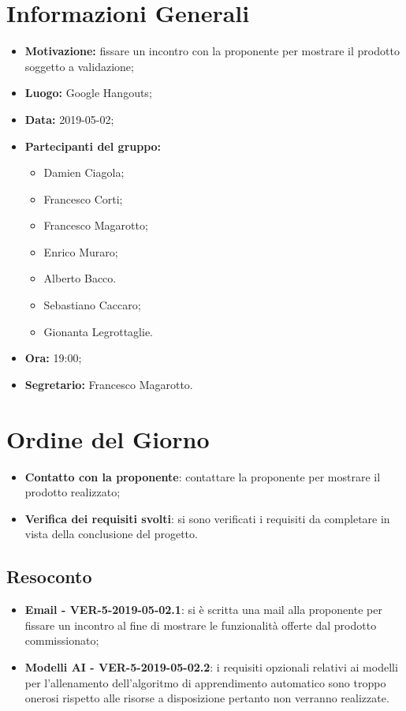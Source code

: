\documentclass[a4paper, oneside, openany, dvipsnames, table]{article}
\begin{document}
\copertina{}


\newpage
\tableofcontents
\newpage
\section{Informazioni Generali}
\begin{itemize}
\item \textbf{Motivazione:} fissare un incontro con la proponente per mostrare il prodotto soggetto a validazione;
\item \textbf{Luogo:} Google Hangouts;
\item \textbf{Data:} 2019-05-02;
\item \textbf{Partecipanti del gruppo:} \hfill
	\begin{itemize}
		\item Damien Ciagola;
		\item Francesco Corti;
		\item Francesco Magarotto;
		\item Enrico Muraro;
		\item Alberto Bacco.
		\item Sebastiano Caccaro;
		\item Gionanta Legrottaglie.
	\end{itemize} 
\item \textbf{Ora:} 19:00;
\item \textbf{Segretario:} Francesco Magarotto.
\end{itemize}

\section{Ordine del Giorno}
\begin{itemize}
	\item \textbf{Contatto con la proponente}: contattare la proponente per mostrare il prodotto realizzato;
	\item \textbf{Verifica dei requisiti svolti}: si sono verificati i requisiti da completare in vista della conclusione del progetto.
\end{itemize}

\subsection{Resoconto}
\begin{itemize}
	\item \textbf{Email - VER-5-2019-05-02.1}: si è scritta una mail alla proponente per fissare un incontro al fine di mostrare le funzionalità offerte dal prodotto commissionato;
	\item \textbf{Modelli AI - VER-5-2019-05-02.2}: i requisiti opzionali relativi ai modelli per l'allenamento dell'algoritmo di apprendimento automatico sono troppo onerosi rispetto alle risorse a disposizione pertanto non verranno realizzate.
	
\end{itemize}
\end{document}
